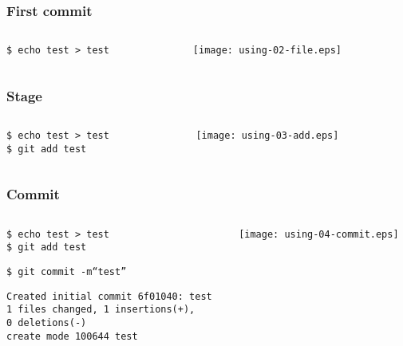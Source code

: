 \documentclass[english]{beamer}
\newcommand{\CMD}[1]{
  \texttt{\textcolor{code-green}{#1}}
}
\newcommand{\cmd}[1]{
  \texttt{\textcolor{code-orange}{#1}}
}
\newcommand{\fnt}[1]{
  \texttt{\textcolor{code-gray}{#1}}
}
\begin{document}
\begin{frame}
\frametitle{First commit}
\begin{columns}[t]
        \begin{column}[T]{.5\textwidth}
                \cmd{\$ echo test > test}
        \end{column}
        \begin{column}[T]{.5\textwidth}
                \texttt{[image: using-02-file.eps]}
        \end{column}
\end{columns}
\end{frame}

\begin{frame}
\frametitle{Stage}
\begin{columns}[t]
        \begin{column}[T]{.5\textwidth}
                \cmd{\$ echo test > test} \\
                \CMD{\$ git add test}
        \end{column}
        \begin{column}[T]{.5\textwidth}
                \texttt{[image: using-03-add.eps]}
        \end{column}
\end{columns}
\end{frame}

\begin{frame}
\frametitle{Commit}
\begin{columns}[t]
        \begin{column}[T]{.5\textwidth}
                \cmd{\$ echo test > test} \\
                \CMD{\$ git add test}

                \vspace{.1\textheight}

                \CMD{\$ git commit -m``test''} \\
                {\tiny
                \fnt{Created initial commit 6f01040: test \\
                       1 files changed, 1 insertions(+), \\ 0 deletions(-) \\
                       create mode 100644 test}
                }
        \end{column}
        \begin{column}[T]{.5\textwidth}
                \texttt{[image: using-04-commit.eps]}
        \end{column}
\end{columns}
\end{frame}
\end{document}
